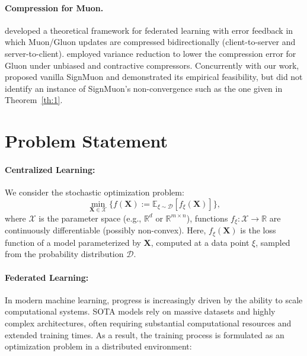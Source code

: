 \documentclass{article}
\begin{document}
\paragraph{Compression for Muon.} \citet{gruntkowska2025error} developed a theoretical framework for federated learning with error feedback in which Muon/Gluon \citep{riabinin2025gluon} updates are compressed bidirectionally (client-to-server and server-to-client). \citet{qian2026communicationefficientgluon} employed variance reduction to lower the compression error for Gluon under unbiased and contractive compressors. Concurrently with our work, \citet{mishra2026signmuon} proposed vanilla SignMuon and demonstrated its empirical feasibility, but did not identify an instance of SignMuon's non-convergence such as the one given in Theorem~\ref{th:1}.

\section{Problem Statement}\label{sec:proState}

\paragraph{Centralized Learning:} We consider the stochastic optimization problem:
\begin{equation}
\min_{\mathbf{X} \in \mathcal{X}} \{f(\mathbf{X}) := \mathbb{E}_{\xi \sim \mathcal{D}} [f_{\xi}(\mathbf{X})]\},
\end{equation}
where $\mathcal{X}$ is the parameter space (e.g., $\mathbb{R}^d$ or $\mathbb{R}^{m \times n}$), functions $f_{\xi} : \mathcal{X} \to \mathbb{R}$ are continuously differentiable (possibly non-convex). Here, $f_{\xi}(\mathbf{X})$ is the loss function of a model parameterized by $\mathbf{X}$, computed at a data point $\xi$, sampled from the probability distribution $\mathcal{D}$.

\paragraph{Federated Learning:} 
In modern machine learning, progress is increasingly driven by the ability to scale computational systems. SOTA models rely on massive datasets and highly complex architectures, often requiring substantial computational resources and extended training times. As a result, the training process is formulated as an optimization problem in a distributed environment:
\end{document}
